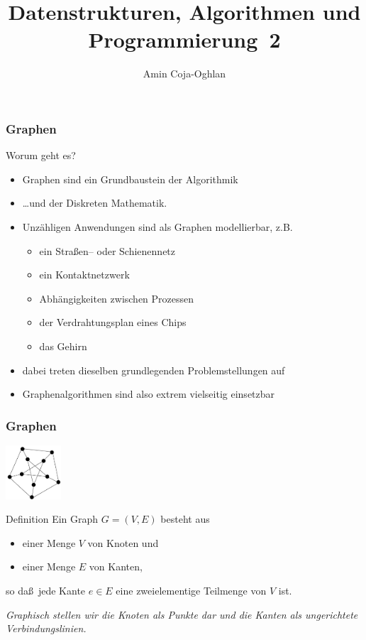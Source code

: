 \documentclass[aspectratio=1610, 11pt]{beamer}
\title{Datenstrukturen, Algorithmen und Programmierung~2}
\author[A.~Coja-Oghlan]{Amin Coja-Oghlan}
\institute[DAP2]{Lehrstuhl Informatik 2\\Fakult\"at f\"ur Informatik}
\newcommand{\mytitle}{Graphen}
\begin{document}
\frame[plain]{\titlepage}

\begin{frame}\frametitle{\mytitle}
	\begin{exampleblock}{Worum geht es?}
		\begin{itemize}
			\item Graphen sind ein Grundbaustein der Algorithmik
			\item \dots und der Diskreten Mathematik.
			\item Unz\"ahligen Anwendungen sind als Graphen modellierbar, z.B.
				\begin{itemize}
					\item ein Stra\ss en-- oder Schienennetz
					\item ein Kontaktnetzwerk
					\item Abh\"angigkeiten zwischen Prozessen
					\item der Verdrahtungsplan eines Chips
					\item das Gehirn
				\end{itemize}
			\item dabei treten dieselben grundlegenden Problemstellungen auf
			\item Graphenalgorithmen sind also extrem vielseitig einsetzbar
		\end{itemize}
	\end{exampleblock}
\end{frame}


\begin{frame}\frametitle{\mytitle}
	\hfill\includegraphics[height=20mm]{images/petersen2.pdf}
	\begin{block}{Definition}
		Ein \alert{Graph} $G=(V,E)$ besteht aus
		\begin{itemize}
			\item einer Menge $V$ von \alert{Knoten} und
			\item einer Menge $E$ von \alert{Kanten},
		\end{itemize}
		so da\ss\ jede Kante $e\in E$ eine zweielementige Teilmenge von $V$ ist.

		\medskip
		\itshape Graphisch stellen wir die Knoten als Punkte dar und die Kanten als ungerichtete Verbindungslinien.
	\end{block}
\end{frame}
\end{document}
